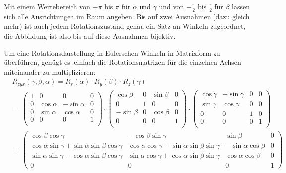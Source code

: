 Mit einem Wertebereich von $-\pi$ bis $\pi$ für $\alpha$ und $\gamma$ und von $-\frac{\pi}{2}$ bis $\frac{\pi}{2}$ für $\beta$ lassen sich alle Ausrichtungen im Raum angeben. Bis auf zwei Ausnahmen (dazu gleich mehr) ist auch jedem Rotationszustand genau ein Satz an Winkeln zugeordnet, die Abbildung ist also bis auf diese Ausnahmen bijektiv.

Um eine Rotationsdarstellung in Eulerschen Winkeln in Matrixform zu überführen, genügt es, einfach die Rotationsmatrizen für die einzelnen Achsen miteinander zu multiplizieren:
\begin{equation}
\begin{split}
 &R_{zyx}( \gamma, \beta, \alpha ) = R_x( \alpha ) \cdot R_y( \beta ) \cdot R_z( \gamma ) \\
 &=
 \begin{pmatrix}
  1 & 0 & 0 & 0 \\
  0 & \cos \alpha & -\sin \alpha & 0 \\
  0 & \sin \alpha &  \cos \alpha & 0 \\
  0 & 0 & 0 & 1 \\
 \end{pmatrix} \cdot
 \begin{pmatrix}
  \cos \beta & 0 & \sin \beta & 0 \\
  0 & 1 & 0 & 0 \\
  -\sin \beta & 0 & \cos \beta & 0 \\
  0 & 0 & 0 & 1 \\
 \end{pmatrix} \cdot
 \begin{pmatrix}
  \cos \gamma & -\sin \gamma & 0 & 0 \\
  \sin \gamma &  \cos \gamma & 0 & 0 \\
  0 & 0 & 1 & 0 \\
  0 & 0 & 0 & 1 \\
 \end{pmatrix} \\
 &=
 \begin{pmatrix}
  \cos \beta \cos \gamma & -\cos \beta \sin \gamma & \sin \beta & 0 \\
  \cos \alpha \sin \gamma + \sin \alpha \sin \beta \cos \gamma & \cos \alpha \cos \gamma - \sin \alpha \sin \beta \sin \gamma & -\sin \alpha \cos \beta & 0 \\
  \sin \alpha \sin \gamma - \cos \alpha \sin \beta \cos \gamma & \sin \alpha \cos \gamma + \cos \alpha \sin \beta \sin \gamma & \cos \alpha \cos \beta & 0 \\
  0 & 0 & 0 & 1
 \end{pmatrix}
\end{split}
\end{equation}

